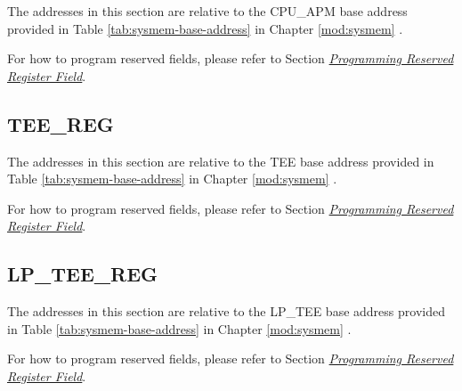 \documentclass[main\_\_EN.tex]{subfiles}
\begin{document}
The addresses in this section are relative to the CPU\_APM base address provided in Table \ref{tab:sysmem-base-address} in Chapter \ref{mod:sysmem} \textit{}.

For how to program reserved fields, please refer to Section \hyperref[programming-reserved-field]{\textit{Programming Reserved Register Field}}.



\subsection{TEE\_REG}

The addresses in this section are relative to the TEE base address provided in Table \ref{tab:sysmem-base-address} in Chapter \ref{mod:sysmem} \textit{}.

For how to program reserved fields, please refer to Section \hyperref[programming-reserved-field]{\textit{Programming Reserved Register Field}}.



\subsection{LP\_TEE\_REG}

The addresses in this section are relative to the LP\_TEE base address provided in Table \ref{tab:sysmem-base-address} in Chapter \ref{mod:sysmem} \textit{}.

For how to program reserved fields, please refer to Section \hyperref[programming-reserved-field]{\textit{Programming Reserved Register Field}}.


\end{document}
